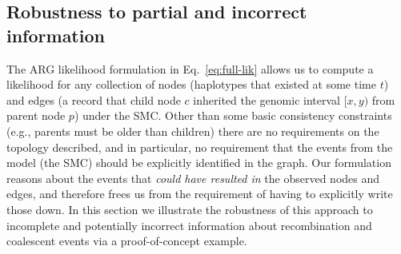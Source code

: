 \documentclass{article}
\begin{document}


\subsection*{Robustness to partial and incorrect information}
The ARG likelihood formulation in 
Eq.~\eqref{eq:full-lik} allows us to compute a likelihood for any 
collection of nodes (haplotypes that existed at some time $t$) and 
edges (a record that child node $c$
inherited the genomic interval $[x, y)$ from parent node $p$)
under the SMC. Other than some basic consistency constraints (e.g., parents
must be older than children) there are no requirements on the topology
described, and in particular, no requirement that the events from the
model (the SMC) should be explicitly identified in the graph. Our
formulation reasons about the events that \emph{could have resulted in}
the observed nodes and edges, and therefore frees us from the requirement
of having to explicitly write those down. In this section we
illustrate the robustness
of this approach to incomplete and potentially incorrect
information about recombination and
coalescent events via a proof-of-concept example.
\end{document}
